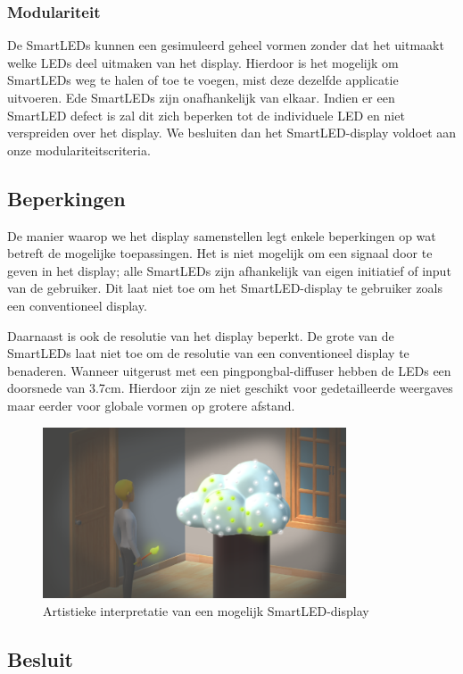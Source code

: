 \documentclass{article}
\begin{document}
\subsubsection{Modulariteit}

De SmartLEDs kunnen een gesimuleerd geheel vormen zonder dat het uitmaakt welke LEDs deel uitmaken van het display. Hierdoor is het mogelijk om SmartLEDs weg te halen of toe te voegen, mist deze dezelfde applicatie uitvoeren. Ede SmartLEDs zijn onafhankelijk van elkaar. Indien er een SmartLED defect is zal dit zich beperken tot de individuele LED en niet verspreiden over het display. We besluiten dan het SmartLED-display voldoet aan onze modulariteitscriteria.

\subsection{Beperkingen}
De manier waarop we het display samenstellen legt enkele beperkingen op wat betreft de mogelijke toepassingen. Het is niet mogelijk om een signaal door te geven in het display; alle SmartLEDs zijn afhankelijk van eigen initiatief of input van de gebruiker. Dit laat niet toe om het SmartLED-display te gebruiker zoals een conventioneel display. 

Daarnaast is ook de resolutie van het display beperkt. De grote van de SmartLEDs laat niet toe om de resolutie van een conventioneel display te benaderen. Wanneer uitgerust met een pingpongbal-diffuser hebben de LEDs een doorsnede van 3.7cm. Hierdoor zijn ze niet geschikt voor gedetailleerde weergaves maar eerder voor globale vormen op grotere afstand.

\begin{figure}[H]
\centering
\includegraphics[width=9cm]{MogelijkDisplay.png}
\caption{Artistieke interpretatie van een mogelijk SmartLED-display}
\label{fig:display}
\end{figure}


\subsection{Besluit}
\end{document}
